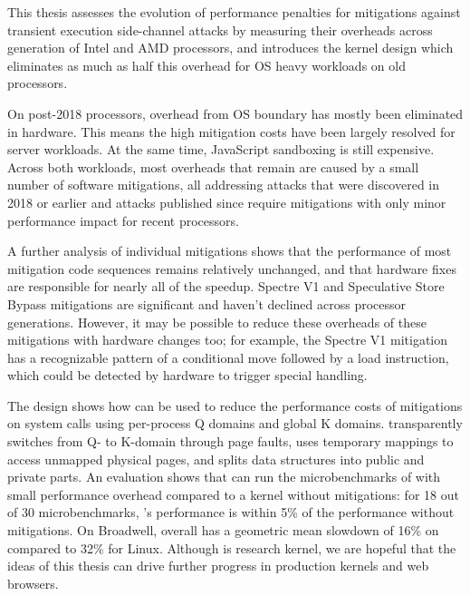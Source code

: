 \label{s:concl}

This thesis assesses the evolution of performance penalties for
mitigations against transient execution side-channel attacks by
measuring their overheads across generation of Intel and AMD
processors, and introduces the \sys kernel design which eliminates as much
as half this overhead for OS heavy workloads on old processors.

On post-2018 processors, overhead from OS boundary has mostly been eliminated in hardware.
This means the high mitigation costs have been largely resolved for server workloads.
At the same time, JavaScript sandboxing is still expensive.
Across both workloads, most overheads that remain  are caused by a small number of software mitigations, all addressing attacks that were discovered in 2018 or earlier and attacks published since require mitigations with only minor performance impact for recent processors.

A further analysis of individual mitigations shows that the performance of most mitigation code sequences remains relatively unchanged, and that hardware fixes are responsible for nearly all of the speedup.
Spectre V1 and Speculative Store Bypass mitigations are significant and haven't declined across processor generations.
However, it may be possible to reduce these overheads of these mitigations with hardware changes too;
for example, the Spectre V1 mitigation has a recognizable pattern of a
conditional move followed by a load instruction, which could be
detected by hardware to trigger special handling.

The \sys design
shows how \contract can be used to reduce the performance costs of
mitigations on system calls using per-process Q domains and global K
domains.  \sys transparently switches from Q- to K-domain through page
faults, uses temporary mappings to access unmapped physical pages, and
splits data structures into public and private parts.  An evaluation
shows that \sys can run the microbenchmarks of \bench with small
performance overhead compared to a kernel without mitigations: for
18 out of 30 \bench microbenchmarks, \sys's performance is within 5\%
of the performance without mitigations.
On Broadwell, \sys overall has a geometric mean slowdown of 16\% on \bench compared to 32\% for Linux.
Although \sys is research kernel, we are hopeful that the ideas of this thesis can drive further progress in production kernels and web browsers.
